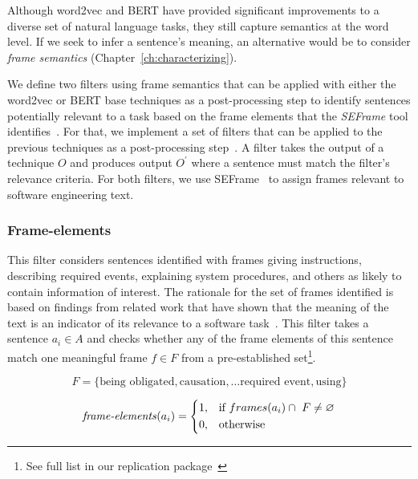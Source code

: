 


Although word2vec and BERT have provided significant improvements to a diverse set of natural language tasks, 
they still capture semantics at the word level. 
If we seek to infer a sentence's meaning, an alternative would be to consider  \textit{frame semantics} (Chapter~\ref{ch:characterizing}).


We define two filters using frame semantics that can be
applied with either the word2vec or BERT base techniques as
 a post-processing step to identify sentences potentially relevant to a task based on the frame elements that the \textit{SEFrame} tool identifies~\cite{marques2020}.
For that, we implement a set of filters that can be applied to the previous techniques as a post-processing step~\cite{Manning2009IR}.
A filter takes the output of a technique $O$ and produces output $O^{\prime}$ where a sentence must match the filter's relevance criteria. For both filters, we use SEFrame~\cite{marques2021} to assign frames relevant to
software engineering text.





\subsubsection{Frame-elements}

This filter considers sentences identified with
frames giving instructions, describing required events, explaining system procedures, and others as
 likely to contain information of interest. The rationale for
 the set of frames identified is based on findings from related work that have shown that 
the meaning of the text is an indicator of its relevance to a software task~\cite{marques2020}.
This filter takes a sentence $a_i \in A$ and checks whether any of the frame elements
of this sentence match one meaningful frame $f \in F$ from a pre-established set\footnote{\label{full-list}See full list in our replication package~\cite{dsandroid}}. 

\begin{small}
\begin{equation}
F = \{ \text{being obligated}, \text{causation}, \dots \text{required event}, \text{using} \} 
\end{equation}

\begin{equation}
\text{\textit{frame-elements}}(a_i) = \left \{
\begin{aligned}
    &1, && \text{if}\ frames(a_i) \cap ~F \ne \emptyset \\
    &0, && \text{otherwise}
\end{aligned} \right.
\end{equation} 
\end{small}


